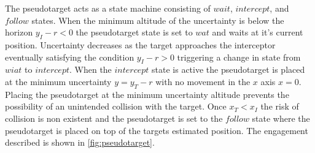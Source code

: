 \documentclass[]{aiaa-tc}%
\begin{document}
The pseudotarget acts as a state machine consisting of $wait$, $intercept$, and $follow$ states. When the minimum altitude of the uncertainty is below the horizon $y_I-r<0$ the pseudotarget state is set to $wat$ and waits at it's current position. Uncertainty decreases as the target approaches the interceptor eventually satisfying the condition $y_I-r >0$ triggering a change in state from $wiat$ to $intercept$. When the $intercept$ state is active the pseudotarget is placed at the minimum uncertainty $y=y_T-r$ with no movement in the $x$ axis $x=0$. Placing the pseudotarget at the minimum uncertainty altitude prevents the possibility of an unintended collision with the target. Once $x_T<x_I$ the risk of collision is non existent and the pseudotarget is set to the $follow$ state where the pseudotarget is placed on top of the targets estimated position. The engagement described is shown in \ref{fig:pseudotarget}.






\end{document}
